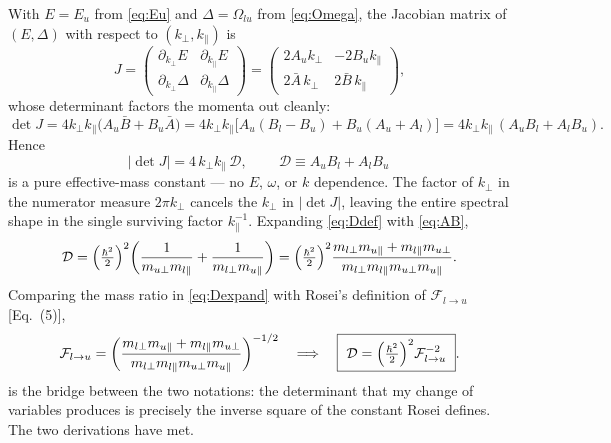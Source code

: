 \documentclass[11pt]{article}
\newcommand{\kperp}{k_{\perp}}
\newcommand{\kpar}{k_{\parallel}}
\newcommand{\Dc}{\mathcal{D}}
\newcommand{\Flu}{\mathcal{F}_{l\to u}}
\newcommand{\Ab}{\bar{A}}
\newcommand{\Bb}{\bar{B}}
\newcommand{\Rq}[1]{\textcolor{roseicol}{\textnormal{(#1)}}}
\begin{document}
With $E=E_u$ from \eqref{eq:Eu} and $\Delta=\Omega_{lu}$ from \eqref{eq:Omega}, the
Jacobian matrix of $(E,\Delta)$ with respect to $(\kperp,\kpar)$ is
%
\begin{equation}
J=\begin{pmatrix}
\partial_{\kperp}E & \partial_{\kpar}E\\[3pt]
\partial_{\kperp}\Delta & \partial_{\kpar}\Delta
\end{pmatrix}
=\begin{pmatrix}
2A_u\kperp & -2B_u\kpar\\[3pt]
2\Ab\,\kperp & 2\Bb\,\kpar
\end{pmatrix},
\end{equation}
%
whose determinant factors the momenta out cleanly:
%
\begin{equation}
\det J = 4\kperp\kpar\bigl(A_u\Bb+B_u\Ab\bigr)
       = 4\kperp\kpar\bigl[A_u(B_l-B_u)+B_u(A_u+A_l)\bigr]
       = 4\kperp\kpar\,(A_uB_l+A_lB_u).
\end{equation}
%
Hence
%
\begin{equation}
|\det J| = 4\,\kperp\kpar\,\Dc,
\qquad
\boxed{\ \Dc\equiv A_uB_l+A_lB_u\ }
\label{eq:Ddef}
\end{equation}
%
is a pure effective-mass constant --- no $E$, $\omega$, or $k$ dependence. The factor of
$\kperp$ in the numerator measure $2\pi\kperp$ cancels the $\kperp$ in $|\det J|$, leaving
the entire spectral shape in the single surviving factor $\kpar^{-1}$. Expanding
\eqref{eq:Ddef} with \eqref{eq:AB},
%
\begin{equation}
\Dc=\Bigl(\tfrac{\hbar^2}{2}\Bigr)^{2}
\!\left(\frac{1}{m_{u\perp}m_{l\|}}+\frac{1}{m_{l\perp}m_{u\|}}\right)
=\Bigl(\tfrac{\hbar^2}{2}\Bigr)^{2}
\frac{m_{l\perp}m_{u\|}+m_{l\|}m_{u\perp}}{m_{l\perp}m_{l\|}m_{u\perp}m_{u\|}} .
\label{eq:Dexpand}
\end{equation}
%
Comparing the mass ratio in \eqref{eq:Dexpand} with Rosei's definition of $\Flu$
[Eq.~\Rq{5}],
%
\begin{equation}
\Flu=\left(\frac{m_{l\perp}m_{u\|}+m_{l\|}m_{u\perp}}{m_{l\perp}m_{l\|}m_{u\perp}m_{u\|}}\right)^{-1/2}
\quad\Longrightarrow\quad
\boxed{\ \Dc=\Bigl(\tfrac{\hbar^2}{2}\Bigr)^{2}\Flu^{-2}\ }.
\label{eq:bridge}
\end{equation}
%
 is the bridge between the two notations: the determinant that my
change of variables produces is precisely the inverse square of the constant Rosei
defines. The two derivations have met.

\end{document}
